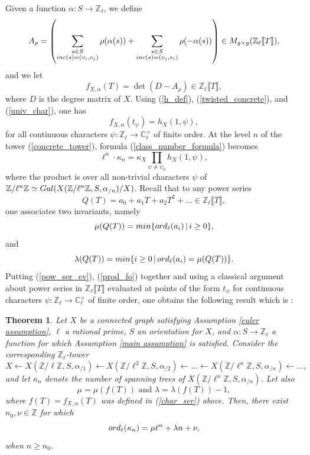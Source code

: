 \documentclass[11pt]{amsart}
\newtheorem{theorem}{Theorem}[section]
\numberwithin{equation}{section}
\theoremstyle{remark}
\newcommand{\op}[1]{\operatorname{#1}}
\begin{document}
Given a function $\alpha:S \rightarrow \mathbb{Z}_{\ell}$, we define
$$A_{\rho} = \left(\sum_{\substack{s \in S \\ {\rm inc}(s) = (v_{i},v_{j})}}\rho(\alpha(s)) + \sum_{\substack{s \in S \\ {\rm inc}(s) = (v_{j},v_{i})}}\rho(-\alpha(s)) \right) \in M_{g \times g}(\mathbb{Z}_{\ell}\llbracket T \rrbracket),$$ 
and we let
\begin{equation} \label{char_ser}
f_{X,\alpha}(T) = \op{det}(D - A_{\rho}) \in \mathbb{Z}_{\ell}\llbracket T \rrbracket, 
\end{equation}
where $D$ is the degree matrix of $X$.  Using (\ref{h_def}), (\ref{twisted_concrete}), and (\ref{univ_char}), one has
\begin{equation} \label{pow_ser_ev}
f_{X,\alpha}(t_{\psi}) = h_X(1,\psi), 
\end{equation}
for all continuous characters $\psi:\mathbb{Z}_{\ell} \rightarrow \mathbb{C}_{\ell}^{\times}$ of finite order. At the level $n$ of the tower (\ref{concrete_tower}), formula (\ref{class_number_formula}) becomes
\begin{equation} \label{prod_fo}
\ell^{n} \cdot \kappa_{n} = \kappa_{X} \prod_{\psi \neq \psi_{0}}h_{X}(1,\psi), 
\end{equation}
where the product is over all non-trivial characters $\psi$ of $\mathbb{Z}/\ell^{n}\mathbb{Z} \simeq {\rm Gal}(X(\mathbb{Z}/\ell^{n}\mathbb{Z},S,\alpha_{/n})/X)$.  Recall that to any power series 
$$Q(T) = a_{0} + a_{1}T +a_{2}T^{2}+\ldots \in \mathbb{Z}_{\ell}\llbracket T \rrbracket,$$ 
one associates two invariants, namely
$$\mu(Q(T)) = {\rm min}\{{\rm ord}_{\ell}(a_{i}) \, | \, i \ge 0\},$$
and
$$\lambda(Q(T)) = {\rm min}\{i \ge 0 \, | \, {\rm ord}_{\ell}(a_{i}) = \mu(Q(T))\}.$$
Putting (\ref{pow_ser_ev}), (\ref{prod_fo}) together and using a classical argument about power series in $\mathbb{Z}_{\ell}\llbracket T \rrbracket$ evaluated at points of the form $t_{\psi}$ for continuous characters $\psi:\mathbb{Z}_{\ell} \rightarrow \mathbb{C}_{\ell}^{\times}$ of finite order, one obtains the following result which is \cite[Theorem 6.1]{mcgownvallieresIII}:
\begin{theorem} \label{Iw_anal_graph}
Let $X$ be a connected graph satisfying Assumption \ref{euler assumption}, $\ell$ a rational prime, $S$ an orientation for $X$, and $\alpha:S \rightarrow \mathbb{Z}_{\ell}$ a function for which Assumption \ref{main assumption} is satisfied.  Consider the corresponding $\mathbb{Z}_{\ell}$-tower
\begin{equation} \label{tto}
X \leftarrow X(\mathbb{Z}/\ell\mathbb{Z},S,\alpha_{/1}) \leftarrow X(\mathbb{Z}/\ell^{2}\mathbb{Z},S,\alpha_{/2})\leftarrow \ldots \leftarrow X(\mathbb{Z}/\ell^{n}\mathbb{Z},S,\alpha_{/n}) \leftarrow \ldots,
\end{equation}
and let $\kappa_{n}$ denote the number of spanning trees of $X(\mathbb{Z}/\ell^{n}\mathbb{Z},S,\alpha_{/n})$.  Let also
$$\mu = \mu(f(T)) \text{ and } \lambda = \lambda(f(T)) - 1,$$
where $f(T) = f_{X,\alpha}(T)$ was defined in (\ref{char_ser}) above.  Then, there exist $n_{0},\nu \in \mathbb{Z}$ for which
$${\rm ord}_{\ell}(\kappa_{n}) = \mu \ell^{n} + \lambda n + \nu, $$
when $n\ge n_{0}$.
\end{theorem}
\end{document}
